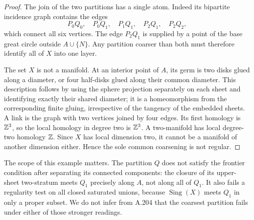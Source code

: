 \begin{proof}
The join of the two partitions has a single atom. Indeed its
bipartite incidence graph contains the edges
\[
 P_0Q_0,\quad P_0Q_1,\quad P_1Q_1,\quad P_2Q_1,\quad P_2Q_2,
\]
which connect all six vertices. The edge $P_2Q_1$ is supplied by a
point of the base great circle outside $A\cup\{N\}$. Any partition
coarser than both must therefore identify all of $X$ into one layer.

The set $X$ is not a manifold. At an interior point of $A$, its germ
is two disks glued along a diameter, or four half-disks glued along
their common diameter. This description follows by using the sphere
projection separately on each sheet and identifying exactly their
shared diameter; it is a homeomorphism from the corresponding finite
gluing, irrespective of the tangency of the embedded sheets. A link
is the graph with two vertices joined by four edges. Its first
homology is $\mathbb Z^3$, so the local homology in degree two is
$\mathbb Z^3$. A two-manifold has local degree-two homology $\mathbb Z$.
Since $X$ has local dimension two, it cannot be a manifold of another
dimension either. Hence the sole common coarsening is not regular.
\end{proof}

The scope of this example matters. The partition $Q$ does not satisfy
the frontier condition after separating its connected components:
the closure of its upper-sheet two-stratum meets $Q_1$ precisely
along $A$, not along all of $Q_1$. It also fails a regularity test
on all closed saturated unions, because $\operatorname{Sing}(X)$
meets $Q_1$ in only a proper subset. We do not infer from A.204 that
the coarsest partition fails under either of those stronger readings.

